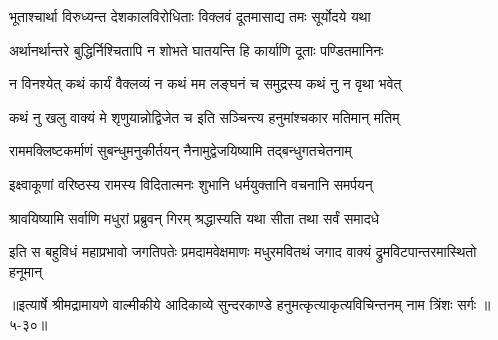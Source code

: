 \twolineshloka
{भूताश्चार्था विरुध्यन्त देशकालविरोधिताः}
{विक्लवं दूतमासाद्य तमः सूर्योदये यथा} %

\twolineshloka
{अर्थानर्थान्तरे बुद्धिर्निश्चितापि न शोभते}
{घातयन्ति हि कार्याणि दूताः पण्डितमानिनः} %

\twolineshloka
{न विनश्येत् कथं कार्यं वैक्लव्यं न कथं मम}
{लङ्घनं च समुद्रस्य कथं नु न वृथा भवेत्} %

\twolineshloka
{कथं नु खलु वाक्यं मे शृणुयान्नोद्विजेत च}
{इति सञ्चिन्त्य हनुमांश्चकार मतिमान् मतिम्} %

\twolineshloka
{राममक्लिष्टकर्माणं सुबन्धुमनुकीर्तयन्}
{नैनामुद्वेजयिष्यामि तद्बन्धुगतचेतनाम्} %

\twolineshloka
{इक्ष्वाकूणां वरिष्ठस्य रामस्य विदितात्मनः}
{शुभानि धर्मयुक्तानि वचनानि समर्पयन्} %

\twolineshloka
{श्रावयिष्यामि सर्वाणि मधुरां प्रब्रुवन् गिरम्}
{श्रद्धास्यति यथा सीता तथा सर्वं समादधे} %

\twolineshloka
{इति स बहुविधं महाप्रभावो जगतिपतेः प्रमदामवेक्षमाणः}
{मधुरमवितथं जगाद वाक्यं द्रुमविटपान्तरमास्थितो हनूमान्} %


॥इत्यार्षे श्रीमद्रामायणे वाल्मीकीये आदिकाव्ये सुन्दरकाण्डे हनुमत्कृत्याकृत्यविचिन्तनम् नाम त्रिंशः सर्गः ॥५-३०॥
